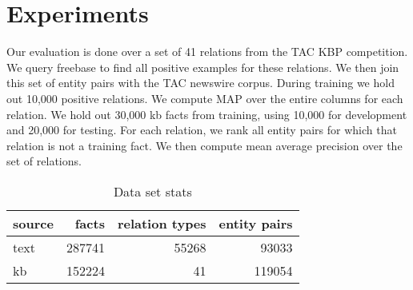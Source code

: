 \section{Experiments}

Our evaluation is done over a set of 41 relations from the TAC KBP competition.
We query freebase to find all positive examples for these relations.
We then join this set of entity pairs with the TAC newswire corpus.
During training we hold out 10,000 positive relations.
We compute MAP over the entire columns for each relation.
We hold out 30,000 kb facts from training, using 10,000 for development and 20,000 for testing.
For each relation, we rank all entity pairs for which that relation is not a training fact.
We then compute mean average precision over the set of relations.


\begin{table}[h!]
\setlength{\tabcolsep}{4.1pt}
\begin{center}
\begin{tabular}{|l|r|r|r|}
\hline
\bf source & facts & relation types & entity pairs \\
\hline\hline
text & 287741 & 55268 & 93033  \\
\hline
kb & 152224 & 41 & 119054 \\
\hline

\hline
\end{tabular}
\caption{Data set stats
\label{data stats}}
\end{center}
\vspace{-.3cm}
\end{table}
